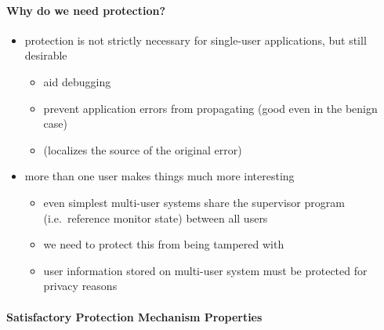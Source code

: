 \documentclass[
  12pt]{findlay}
\providecommand{\tightlist}{%
  \setlength{\itemsep}{0pt}\setlength{\parskip}{0pt}}
\begin{document}
\hypertarget{why-do-we-need-protection}{%
\paragraph{Why do we need protection?}\label{why-do-we-need-protection}}

\begin{itemize}
\tightlist
\item
  protection is not strictly necessary for single-user applications, but
  still desirable

  \begin{itemize}
  \tightlist
  \item
    aid debugging
  \item
    prevent application errors from propagating (good even in the benign
    case)
  \item
    (localizes the source of the original error)
  \end{itemize}
\item
  more than one user makes things much more interesting

  \begin{itemize}
  \tightlist
  \item
    even simplest multi-user systems share the supervisor program
    (i.e.~reference monitor state) between all users
  \item
    we need to protect this from being tampered with
  \item
    user information stored on multi-user system must be protected for
    privacy reasons
  \end{itemize}
\end{itemize}

\hypertarget{satisfactory-protection-mechanism-properties}{%
\paragraph{Satisfactory Protection Mechanism
Properties}\label{satisfactory-protection-mechanism-properties}}
\end{document}
